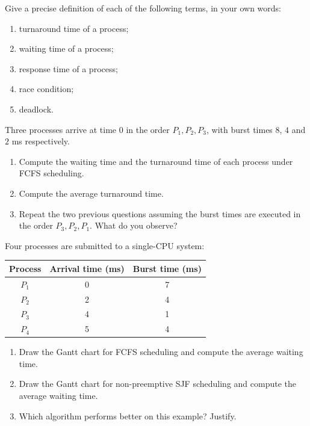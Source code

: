 \documentclass[11pt]{article}
\newcommand{\cle}[1]{{\popxbold\color{popdark}#1}}
\newcounter{popsec}
\newcounter{popsub}
\newcommand{\courssub}[1]{%
  \stepcounter{popsub}%
  \par\vspace{9pt}\noindent{\popxbold\fontsize{11.5}{13}\selectfont\color{popink}{\color{poporange}\thepopsec.\thepopsub}\hspace{6pt}#1}\par\nopagebreak\vspace{4pt}
}
\begin{document}
\begin{exercice}[Definitions]
Give a precise definition of each of the following terms, in your own words:
\begin{enumerate}
\item \cle{turnaround time} of a process;
\item \cle{waiting time} of a process;
\item \cle{response time} of a process;
\item \cle{race condition};
\item \cle{deadlock}.
\end{enumerate}
\end{exercice}

\begin{exercice}
Three processes arrive at time $0$ in the order $P_1, P_2, P_3$, with burst times $8$, $4$ and $2$ ms respectively.
\begin{enumerate}
\item Compute the waiting time and the turnaround time of each process under FCFS scheduling.
\item Compute the average turnaround time.
\item Repeat the two previous questions assuming the burst times are executed in the order $P_3, P_2, P_1$. What do you observe?
\end{enumerate}
\end{exercice}

\courssub{I practise}

\begin{exercice}
Four processes are submitted to a single-CPU system:
\begin{center}
\begin{tabular}{|c|c|c|}
\hline
\rowcolor{popblueL} Process & Arrival time (ms) & Burst time (ms) \\
\hline
$P_1$ & 0 & 7 \\
\hline
$P_2$ & 2 & 4 \\
\hline
$P_3$ & 4 & 1 \\
\hline
$P_4$ & 5 & 4 \\
\hline
\end{tabular}
\end{center}
\begin{enumerate}
\item Draw the Gantt chart for FCFS scheduling and compute the average waiting time.
\item Draw the Gantt chart for non-preemptive SJF scheduling and compute the average waiting time.
\item Which algorithm performs better on this example? Justify.
\end{enumerate}
\end{exercice}
\end{document}
